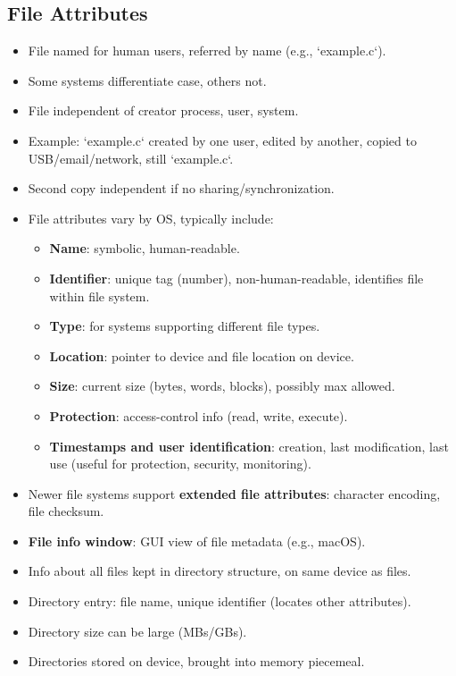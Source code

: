 \subsection*{File Attributes}
\begin{itemize}
    \item File named for human users, referred by name (e.g., `example.c`).
    \item Some systems differentiate case, others not.
    \item File independent of creator process, user, system.
    \item Example: `example.c` created by one user, edited by another, copied to USB/email/network, still `example.c`.
    \item Second copy independent if no sharing/synchronization.
    \item File attributes vary by OS, typically include:
    \begin{itemize}
        \item \textbf{Name}: symbolic, human-readable.
        \item \textbf{Identifier}: unique tag (number), non-human-readable, identifies file within file system.
        \item \textbf{Type}: for systems supporting different file types.
        \item \textbf{Location}: pointer to device and file location on device.
        \item \textbf{Size}: current size (bytes, words, blocks), possibly max allowed.
        \item \textbf{Protection}: access-control info (read, write, execute).
        \item \textbf{Timestamps and user identification}: creation, last modification, last use (useful for protection, security, monitoring).
    \end{itemize}
    \item Newer file systems support \textbf{extended file attributes}: character encoding, file checksum.
    \item \textbf{File info window}: GUI view of file metadata (e.g., macOS).
    \item Info about all files kept in directory structure, on same device as files.
    \item Directory entry: file name, unique identifier (locates other attributes).
    \item Directory size can be large (MBs/GBs).
    \item Directories stored on device, brought into memory piecemeal.
\end{itemize}

